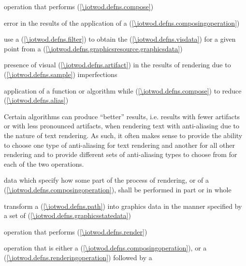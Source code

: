 %
operation that performs  (\ref{\iotwod.defns.compose})

%
error in the results of the application of a  (\ref{\iotwod.defns.composingoperation})

%
use a  (\ref{\iotwod.defns.filter}) to obtain the  (\ref{\iotwod.defns.visdata}) for a given point from a  (\ref{\iotwod.defns.graphicsresource.graphicsdata})

%
presence of visual  (\ref{\iotwod.defns.artifact}) in the results of rendering due to  (\ref{\iotwod.defns.sample}) imperfections

%
application of a function or algorithm while  (\ref{\iotwod.defns.compose}) to reduce  (\ref{\iotwod.defns.alias})
\begin{note}
Certain algorithms can produce ``better'' results, i.e. results with fewer artifacts or with less pronounced artifacts, when rendering text with anti-aliasing due to the nature of text rendering. As such, it often makes sense to provide the ability to choose one type of anti-aliasing for text rendering and another for all other rendering and to provide different sets of anti-aliasing types to choose from for each of the two operations.
\end{note}

%
data which specify how some part of the process of rendering, or of a  (\ref{\iotwod.defns.composingoperation}), shall be performed in part or in whole

%
transform a  (\ref{\iotwod.defns.path}) into graphics data in the manner specified by a set of  (\ref{\iotwod.defns.graphicsstatedata})

%
operation that performs  (\ref{\iotwod.defns.render})

%
operation that is either a  (\ref{\iotwod.defns.composingoperation}), or a  (\ref{\iotwod.defns.renderingoperation}) followed by a 

%

%
%

